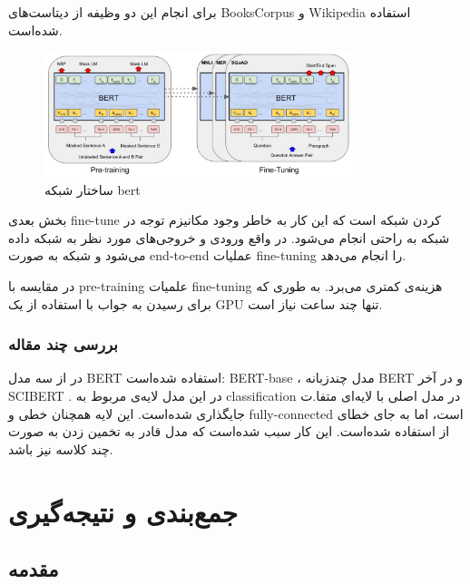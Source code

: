 \documentclass[12pt, a4paper, oneside]{report}
\begin{document}
برای انجام این دو وظیفه از دیتاست‌های
BooksCorpus
و
Wikipedia
استفاده شده‌است. 

\begin{figure}[h]
    \centering
    \includegraphics[width=0.8\textwidth]{bert}
    \caption{ ساختار شبکه bert }
    \label{fig:bert}
\end{figure}

بخش بعدی
fine-tune
کردن شبکه است که این کار به خاطر وجود مکانیزم توجه در شبکه به راحتی انجام می‌شود.
در واقع ورودی و خروجی‌های مورد نظر به شبکه داده می‌شود و شبکه به صورت
end-to-end
عملیات
fine-tuning
را انجام می‌دهد.

در مقایسه با
pre-training
علمیات
fine-tuning
هزینه‌ی کمتری می‌برد. به طوری که برای رسیدن به جواب با استفاده از یک
GPU
تنها چند ساعت نیاز است.\cite{devlin2018bert}

\subsection{بررسی چند مقاله}

در
\cite{schmidt2020data}
از سه مدل
BERT
استفاده شده‌است:
BERT-base
، مدل چندزبانه
BERT
و در آخر
SCIBERT
.
در این مدل لایه‌ی مربوط به
classification
در مدل اصلی با لایه‌ای متفا.ت جایگذاری شده‌است. این لایه همچنان خطی و
fully-connected
است، اما به جای خطای
از
استفاده شده‌است. این کار سبب شده‌است که مدل قادر به تخمین زدن به صورت چند کلاسه نیز باشد.

\chapter{جمع‌بندی و نتیجه‌گیری}
\pagebreak
\section{مقدمه}

\begin{latin}
    
\end{latin}
\end{document}
